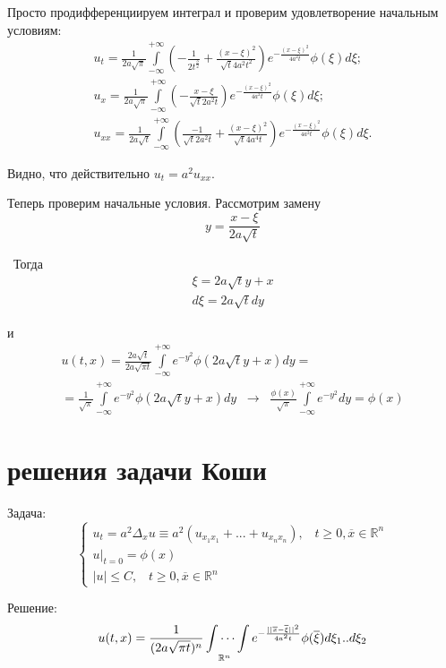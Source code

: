 \begin{chck}
	Просто продифференциируем интеграл и проверим удовлетворение начальным условиям:
	\begin{gather*}
		u_t = \frac{1}{2a\sqrt{\pi}}\int\limits^{+\infty}_{-\infty} (-\frac{1}{2t^{ \frac{3}{2}}} + \frac{(x-\xi)^2}{\sqrt{t} 4a^2t^2})e^{- \frac{(x-\xi)^2}{4a^2t}}\phi(\xi)d\xi;\\
		u_x = \frac{1}{2a\sqrt{\pi}}\int\limits^{+\infty}_{-\infty} (-\frac{x-\xi}{\sqrt{t}2a^2t})e^{-\frac{(x-\xi)^2}{4a^2t}}\phi(\xi)d\xi;\\
		u_{xx} = \frac{1}{2a\sqrt{t}}\int\limits^{+\infty}_{-\infty} (\frac{-1}{\sqrt{t}2a^2t} + \frac{(x-\xi)^2}{\sqrt{t}4a^4t})e^{-\frac{(x-\xi)^2}{4a^2t}}\phi(\xi)d\xi.
	\end{gather*}

	Видно, что действительно $ u_t = a^2u _{xx}.$

	Теперь проверим начальные условия. Рассмотрим замену
	\[
		y = \frac{x-\xi}{2a\sqrt{t}}
	\]

	 Тогда
	\begin{gather*}
		\xi = 2a\sqrt{t}y + x\\
		d\xi = 2a\sqrt{t}dy
	\end{gather*}

	и
	\begin{gather*}
		u(t,x) = \frac{2a\sqrt{t}}{2a\sqrt{\pi t}}\int\limits^{+\infty}_{-\infty} e^{-y^2}\phi(2a\sqrt{t}y + x)dy=\\
		= \frac{1}{\sqrt{\pi}}\int\limits^{+\infty}_{-\infty} e^{-y^2}\phi(2a\sqrt{t}y + x)dy \;\; \rightarrow\;\; \frac{\phi(x)}{\sqrt\pi}\int\limits^{+\infty}_{-\infty}e^{-y^2}dy = \phi(x)
	\end{gather*}
\end{chck}

\section{ решения задачи Коши}

Задача:
\[
	\begin{cases}
		u_t=a^2\Delta_x u \equiv a^2(u_{x_1x_1}+ ...+ u_{x_nx_n}), \;\;\;t \geq 0, \overline{x} \in \mathbb{R}^n\\
		u|_{t=0} = \phi(x)\\
		|u| \leq C, \;\;\;t \geq 0, \overline{x} \in \mathbb{R}^n
	\end{cases}
\]

Решение:
\[
	u(t,x) = \frac{1}{(2a\sqrt{\pi t})^n}\idotsint\limits_{\mathbb{R}^n}e^{-\frac{||\overline{x}-\overline{\xi}||^2}{4a^2t}}\phi(\overline{\xi})d\xi_1..d\xi_2
\]